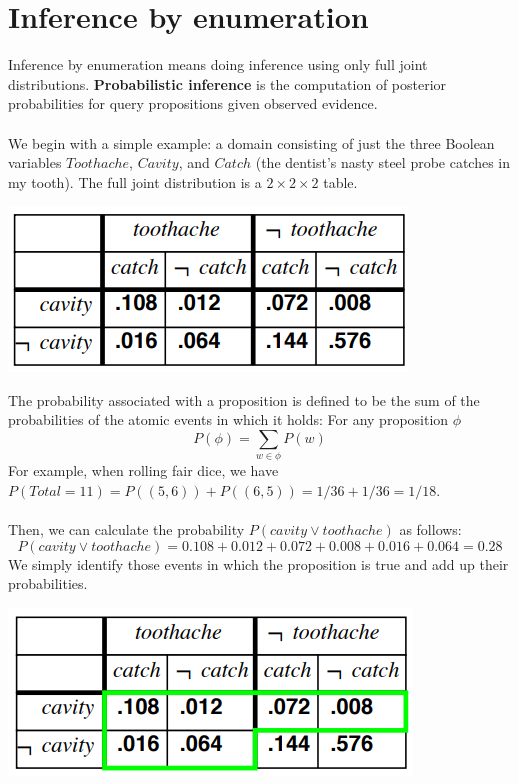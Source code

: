 \section{Inference by enumeration}
Inference by enumeration means doing inference using only full joint distributions. \textbf{Probabilistic inference} is the computation of posterior probabilities for query propositions given observed evidence.\\\\
We begin with a simple example: a domain consisting of just the three Boolean variables $Toothache$, $Cavity$, and $Catch$ (the dentist’s nasty steel probe catches in my tooth). The full joint distribution is a $2 \times 2 \times 2$ table.
\begin{center}
    \includegraphics[]{images/dentist-table.png}
\end{center}
The probability associated with a proposition is defined to be the sum of the probabilities of the atomic events in which it holds: For any proposition $\phi$
\[P(\phi) = \sum_{w \in \phi}P(w)\]
For example, when rolling fair dice, we have $P(Total = 11) = P((5, 6)) + P((6, 5)) = 1/36 + 1/36 = 1/18$. \\\\
Then, we can calculate the probability $P(cavity \lor toothache)$ as follows:
\[P(cavity \lor toothache) = 0.108 + 0.012 + 0.072 + 0.008 + 0.016 + 0.064 = 0.28\]
We  simply identify those events in which the proposition is true and add up their probabilities.
\begin{center}
    \includegraphics[]{images/dentist-table-2.png}
\end{center}
